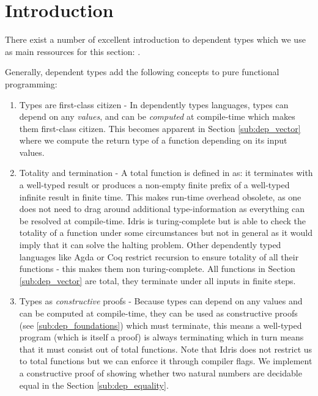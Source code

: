 \section{Introduction}
\label{sec:dep_background}

There exist a number of excellent introduction to dependent types which we use as main ressources for this section: \cite{thompson_type_1991, program_homotopy_2013, stump_verified_2016, brady_type-driven_2017, pierce_programming_2018}.

Generally, dependent types add the following concepts to pure functional programming:

\begin{enumerate}
	\item Types are first-class citizen - In dependently types languages, types can depend on any \textit{values}, and can be \textit{computed} at compile-time which makes them first-class citizen. This becomes apparent in Section \ref{sub:dep_vector} where we compute the return type of a function depending on its input values.

	\item Totality and termination - A total function is defined in \cite{brady_type-driven_2017} as: it terminates with a well-typed result or produces a non-empty finite prefix of a well-typed infinite result in finite time. This makes run-time overhead obsolete, as one does not need to drag around additional type-information as everything can be resolved at compile-time. Idris is turing-complete but is able to check the totality of a function under some circumstances but not in general as it would imply that it can solve the halting problem. Other dependently typed languages like Agda or Coq restrict recursion to ensure totality of all their functions - this makes them non turing-complete. All functions in Section \ref{sub:dep_vector} are total, they terminate under all inputs in finite steps.

	\item Types as \textit{constructive} proofs - Because types can depend on any values and can be computed at compile-time, they can be used as constructive proofs (see \ref{sub:dep_foundations}) which must terminate, this means a well-typed program (which is itself a proof) is always terminating which in turn means that it must consist out of total functions. Note that Idris does not restrict us to total functions but we can enforce it through compiler flags. We implement a constructive proof of showing whether two natural numbers are decidable equal in the Section \ref{sub:dep_equality}.
\end{enumerate}

